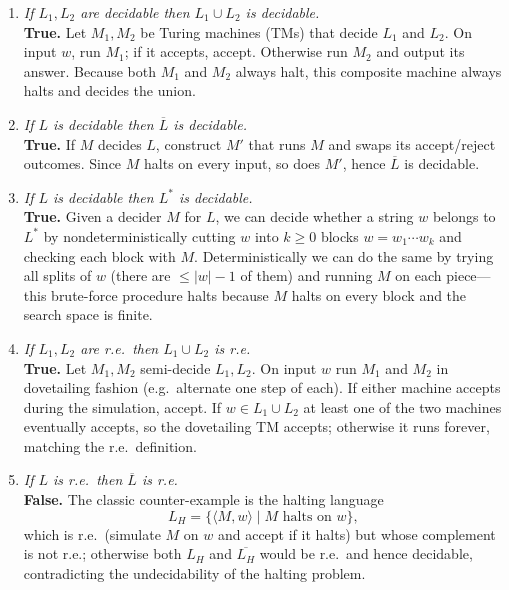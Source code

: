\documentclass{article}
\theoremstyle{theorem}
\theoremstyle{definition}
\theoremstyle{remark}
\begin{document}
\begin{enumerate}
  \item \emph{If $L_1,L_2$ are decidable then $L_1\cup L_2$ is decidable.}\\[2pt]
        \textbf{True.}  Let $M_1,M_2$ be Turing machines (TMs) that decide $L_1$ and $L_2$.  
        On input $w$, run $M_1$; if it accepts, accept.  
        Otherwise run $M_2$ and output its answer.  
        Because both $M_1$ and $M_2$ always halt, this composite machine always halts and decides the union.

  \item \emph{If $L$ is decidable then $\overline L$ is decidable.}\\[2pt]
        \textbf{True.}  If $M$ decides $L$, construct $M'$ that runs $M$ and swaps its accept/reject outcomes.  
        Since $M$ halts on every input, so does $M'$, hence $\overline L$ is decidable.

\newpage

  \item \emph{If $L$ is decidable then $L^{\!*}$ is decidable.}\\[2pt]
        \textbf{True.}  Given a decider $M$ for $L$, we can decide whether a string $w$ belongs to $L^{\!*}$ by
        nondeterministically cutting $w$ into $k\ge 0$ blocks $w=w_1\cdots w_k$ and checking each block with $M$.  
        Deterministically we can do the same by trying all splits of $w$ (there are $\le |w|-1$ of them) and running
        $M$ on each piece—this brute-force procedure halts because $M$ halts on every block and the search space is finite.

  \item \emph{If $L_1,L_2$ are r.e.\ then $L_1\cup L_2$ is r.e.}\\[2pt]
        \textbf{True.}  Let $M_1,M_2$ semi-decide $L_1,L_2$.  
        On input $w$ run $M_1$ and $M_2$ in dovetailing fashion (e.g.\ alternate one step of each).  
        If either machine accepts during the simulation, accept.  
        If $w\in L_1\cup L_2$ at least one of the two machines eventually accepts, so the dovetailing TM accepts; otherwise it runs forever, matching the r.e.\ definition.

  \item \emph{If $L$ is r.e.\ then $\overline L$ is r.e.}\\[2pt]
        \textbf{False.}  The classic counter-example is the halting language
        $$
          L_H=\{\langle M,w\rangle\mid M\text{ halts on }w\},
        $$
        which is r.e.\ (simulate $M$ on $w$ and accept if it halts) but whose complement is not r.e.; otherwise both $L_H$ and $\overline{L_H}$ would be r.e.\ and hence decidable, contradicting the undecidability of the halting problem.


\end{enumerate}
\end{document}
